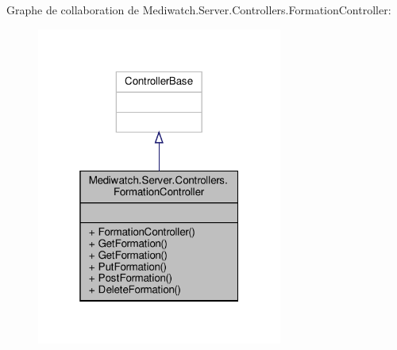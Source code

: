 Graphe de collaboration de Mediwatch.\+Server.\+Controllers.\+Formation\+Controller\+:
\nopagebreak
\begin{figure}[H]
\begin{center}
\leavevmode
\includegraphics[width=229pt]{class_mediwatch_1_1_server_1_1_controllers_1_1_formation_controller__coll__graph}
\end{center}
\end{figure}
